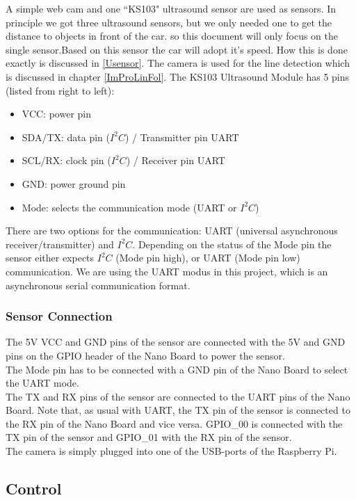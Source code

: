 \documentclass[11pt,twocolumn]{article}
\begin{document}
A simple web cam and one “KS103" ultrasound sensor are used as sensors. In principle we got three ultrasound sensors, but we only needed one to get the distance to objects in front of the car. so this document will only focus on the single sensor.Based on this sensor the car will adopt it's speed. How this is done exactly is discussed in \ref{Usensor}. The camera is used for the line detection which is discussed in chapter \ref{ImProLinFol}.\newpage
The KS103 Ultrasound Module has 5 pins (listed from right to left):
\begin{itemize}
\item VCC: power pin
\item SDA/TX: data pin ($I^2C$) / Transmitter pin UART
\item SCL/RX: clock pin ($I^2C$) / Receiver pin UART
\item GND: power ground pin
\item Mode: selects the communication mode (UART or $I^2C$)
\end{itemize}
There are two options for the communication: UART (universal asynchronous receiver/transmitter) and $I^2C$. Depending on the status of the Mode pin the sensor either expects $I^2C$ (Mode pin high), or UART (Mode pin low) communication. We are using the UART modus in this project, which is an asynchronous serial communication format.

\subsubsection{Sensor Connection}
The 5V VCC and GND pins of the sensor are connected with the 5V and GND pins on the GPIO header of the Nano Board to power the sensor.\\
The Mode pin has to be connected with a GND pin of the Nano Board to select the UART mode.\\
The TX and RX pins of the sensor are connected to the UART pins of the Nano Board. Note that, as usual with UART, the TX pin of the sensor is connected to the RX pin of the Nano Board and vice versa. GPIO\_00 is connected with the TX pin of the sensor and GPIO\_01 with the RX pin of the sensor.\\
The camera is simply plugged into one of the USB-ports of the Raspberry Pi.

\subsection{Control}
\end{document}
